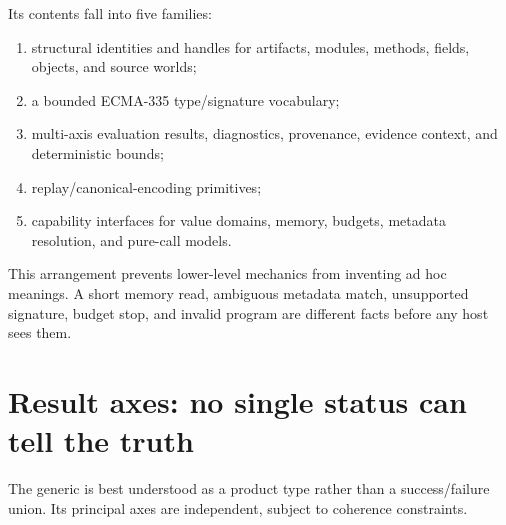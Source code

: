\documentclass[11pt,oneside,openany]{book}
\newcommand{\typeName}[1]{\texttt{\detokenize{#1}}}
\begin{document}
Its contents fall into five families:

\begin{enumerate}
  \item structural identities and handles for artifacts, modules, methods, fields, objects, and source worlds;
  \item a bounded ECMA-335 type/signature vocabulary;
  \item multi-axis evaluation results, diagnostics, provenance, evidence context, and deterministic bounds;
  \item replay/canonical-encoding primitives;
  \item capability interfaces for value domains, memory, budgets, metadata resolution, and pure-call models.
\end{enumerate}

This arrangement prevents lower-level mechanics from inventing ad hoc meanings. A short memory read, ambiguous metadata match, unsupported signature, budget stop, and invalid program are different facts before any host sees them.

\section{Result axes: no single status can tell the truth}

The generic \typeName{EvaluationResult<T>} is best understood as a product type rather than a success/failure union. Its principal axes are independent, subject to coherence constraints.
\end{document}
